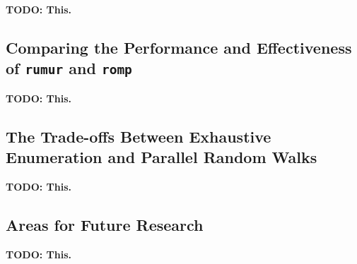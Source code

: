 
\textbf{TODO: This.}

\subsection{Comparing the Performance and Effectiveness of \texttt{rumur} and \texttt{romp}}\label{subsec:comparing-the-performance-and-effectiveness-of-rumur-and-romp}

\textbf{TODO: This.}

\subsection{The Trade-offs Between Exhaustive Enumeration and Parallel Random Walks}\label{subsec:the-trade-offs-between-exhaustive-enumeration-and-parallel-random-walks}

\textbf{TODO: This.}

\subsection{Areas for Future Research}\label{subsec:areas-for-future-research}

\textbf{TODO: This.}
